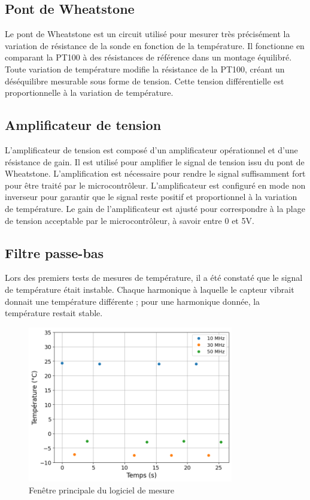 
\subsection{Pont de Wheatstone}
Le pont de Wheatstone est un circuit utilisé pour mesurer très précisément la variation de résistance de la sonde en fonction de la température. 
Il fonctionne en comparant la PT100 à des résistances de référence dans un montage équilibré. Toute variation de température modifie la résistance de la PT100, 
créant un déséquilibre mesurable sous forme de tension. Cette tension différentielle est proportionnelle à la variation de température.

\subsection{Amplificateur de tension}
L'amplificateur de tension est composé d'un amplificateur opérationnel et d'une résistance de gain. 
Il est utilisé pour amplifier le signal de tension issu du pont de Wheatstone.
L'amplification est nécessaire pour rendre le signal suffisamment fort pour être traité par le microcontrôleur.
L'amplificateur est configuré en mode non inverseur pour garantir que le signal reste positif et proportionnel à la variation de température.
Le gain de l'amplificateur est ajusté pour correspondre à la plage de tension acceptable par le microcontrôleur, à savoir entre 0 et 5V.

\subsection{Filtre passe-bas}
Lors des premiers tests de mesures de température, il a été constaté que le signal de température était instable.
Chaque harmonique à laquelle le capteur vibrait donnait une température différente ; pour une harmonique donnée, la température restait stable.
\begin{figure}[H]
    \centering
    \includegraphics[width=0.8\textwidth]{assets/figures/TempBruit.png}
    \caption{Fenêtre principale du logiciel de mesure}
    \label{fig:TempBruit}
\end{figure}

